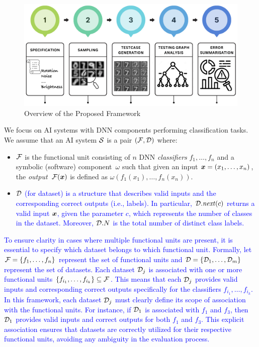 \begin{figure}
  \centering
  \includegraphics[width=\linewidth]{figures/fivesteps.png}
  \caption{Overview of the Proposed Framework}
  \label{fig:framework}
\end{figure}



We focus on AI systems with DNN components performing classification tasks. We assume that an AI system $\S$ is a pair $(\F,\D)$ where:
\begin{itemize}
    \item $\F$ is the functional unit consisting of $n$ DNN \emph{classifiers} $f_1,\dots,f_n$ and a symbolic (software) component~$\omega$ such that given an input $\avec{x}=(x_1,\dots,x_n)$, the \emph{output}~$\F(\avec{x})$ is defined as $\omega(f_1(x_1),\dots,f_n(x_n))$.
    \item \textcolor{blue}{ $\D$ (for dataset) is a structure that describes valid inputs and the corresponding correct outputs (i.e., labels). In particular, $\D.\mathit{next}(c)$ returns a valid input $\avec{x}$, given the parameter $c$, which represents the number of classes in the dataset. Moreover, $\D.N$ is the total number of distinct class labels.}
\end{itemize}

\textcolor{blue}{
To ensure clarity in cases where multiple functional units are present, it is essential to specify which dataset belongs to which functional unit. Formally, let $\F = \{f_1, \dots, f_n\}$ represent the set of functional units and $\D = \{\D_1, \dots, \D_m\}$ represent the set of datasets. Each dataset $\D_j$ is associated with one or more functional units $\{f_{i_1}, \dots, f_{i_k}\} \subseteq \F$. This means that each $\D_j$ provides valid inputs and corresponding correct outputs specifically for the classifiers $f_{i_1}, \dots, f_{i_k}$. In this framework, each dataset $\D_j$ must clearly define its scope of association with the functional units. For instance, if $\D_1$ is associated with $f_1$ and $f_3$, then $\D_1$ provides valid inputs and correct outputs for both $f_1$ and $f_3$. This explicit association ensures that datasets are correctly utilized for their respective functional units, avoiding any ambiguity in the evaluation process.}


